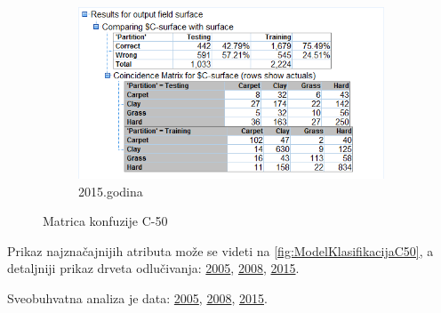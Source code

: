 \documentclass[a4paper]{article}
\begin{document}
\begin{figure}[H]
	\vspace{0.5cm}
	\begin{subfigure}[h]{\textwidth}
		\begin{center}
			\includegraphics[scale=0.50]{Klasifikacija/C50/Analysis_Surface2015.png}
		\end{center}
		\caption{2015.godina}
		\label{fig:MatricaKnfuzijeC502015}
	\end{subfigure}
	
	\caption{Matrica konfuzije C-50}
	\label{fig:MatricaKnfuzijeC50}
\end{figure}

Prikaz najznačajnijih atributa može se videti na \ref{fig:ModelKlasifikacijaC50}, a detaljniji prikaz drveta odlučivanja: \href{file:./Klasifikacija/C50/Model_Surface2005.html}{2005}, \href{file:./Klasifikacija/C50/Model_Surface2008.html}{2008}, \href{file:./Klasifikacija/C50/Model_Surface2005.html}{2015}. 

Sveobuhvatna analiza je data: \href{file:./Klasifikacija/C50/Summary_Surface2005.html}{2005}, \href{file:./Klasifikacija/C50/Summary_Surface2008.html}{2008}, \href{file:./Klasifikacija/C50/Summary_Surface2005.html}{2015}. 
\end{document}
